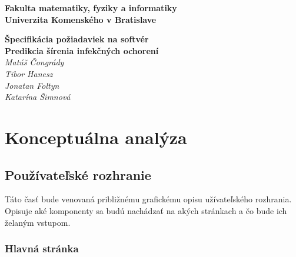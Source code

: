 \documentclass[12pt,a4paper]{report}
\begin{document}
\begin{titlepage}
\centering\bfseries
		Fakulta matematiky, fyziky a informatiky\\Univerzita Komenského v Bratislave	

	\fontsize{23}{28}\textbf{Špecifikácia požiadaviek na softvér}\\
	\fontsize{16}{22}\textbf{Predikcia šírenia infekčných ochorení}\\
	\large\textit{Matúš Čongrády\\Tibor Hanesz\\Jonatan Foltyn\\Katarína Šimnová}

\end{titlepage}\bigskip
	\setcounter{tocdepth}{9}
	\tableofcontents
	
\renewcommand{\chaptername}{}	
\chapter[Konceptuálna analýza]{\rmfamily\bfseries
	Konceptuálna analýza}
	
\section[Používateľské rozhranie]{\rmfamily\bfseries
	Používateľské rozhranie}
Táto  časť  bude  venovaná približnému  grafickému  opisu užívateľského  rozhrania. Opisuje aké komponenty sa budú nachádzať na akých stránkach a čo bude ich želaným vstupom.

\subsection[Hlavná stránka]{\rmfamily\bfseries
	Hlavná stránka}
\end{document}
